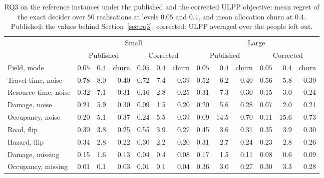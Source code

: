 \begin{table}[H]
\centering
\caption{RQ3 on the reference instances under the published and the corrected ULPP objective: mean regret of the exact decider over $50$ realisations at levels $0.05$ and $0.4$, and mean allocation churn at $0.4$. Published: the values behind Section~\ref{sec:rq3}; corrected: ULPP averaged over the people left out.\label{tab:corrected}}
\scriptsize
\setlength{\tabcolsep}{3pt}
\begin{tabular}{l rrr rrr rrr rrr}
\toprule
& \multicolumn{6}{c}{Small} & \multicolumn{6}{c}{Large}\\
\cmidrule(lr){2-7}\cmidrule(lr){8-13}
& \multicolumn{3}{c}{Published} & \multicolumn{3}{c}{Corrected} & \multicolumn{3}{c}{Published} & \multicolumn{3}{c}{Corrected}\\
\cmidrule(lr){2-4}\cmidrule(lr){5-7}\cmidrule(lr){8-10}\cmidrule(lr){11-13}
Field, mode & $0.05$ & $0.4$ & churn & $0.05$ & $0.4$ & churn & $0.05$ & $0.4$ & churn & $0.05$ & $0.4$ & churn\\
\midrule
Travel time, noise & 0.78 & 8.0 & 0.40 & 0.72 & 7.4 & 0.39 & 0.52 & 6.2 & 0.40 & 0.56 & 5.8 & 0.39\\
Resource time, noise & 0.32 & 7.1 & 0.31 & 0.16 & 2.8 & 0.25 & 0.31 & 7.3 & 0.30 & 0.15 & 3.0 & 0.24\\
Damage, noise & 0.21 & 5.9 & 0.30 & 0.09 & 1.5 & 0.20 & 0.20 & 5.6 & 0.28 & 0.07 & 2.0 & 0.21\\
Occupancy, noise & 0.20 & 5.1 & 0.37 & 0.24 & 5.5 & 0.39 & 0.09 & 14.5 & 0.70 & 0.11 & 15.6 & 0.73\\
Road, flip & 0.30 & 3.8 & 0.25 & 0.55 & 3.9 & 0.27 & 0.45 & 3.6 & 0.31 & 0.35 & 3.9 & 0.30\\
Hazard, flip & 0.34 & 2.8 & 0.22 & 0.30 & 2.2 & 0.20 & 0.31 & 2.7 & 0.24 & 0.23 & 2.8 & 0.26\\
Damage, missing & 0.15 & 1.6 & 0.13 & 0.04 & 0.4 & 0.08 & 0.17 & 1.5 & 0.11 & 0.08 & 0.6 & 0.09\\
Occupancy, missing & 0.01 & 0.1 & 0.03 & 0.01 & 0.1 & 0.04 & 0.36 & 3.0 & 0.27 & 0.30 & 3.3 & 0.28\\
\bottomrule
\end{tabular}
\end{table}
